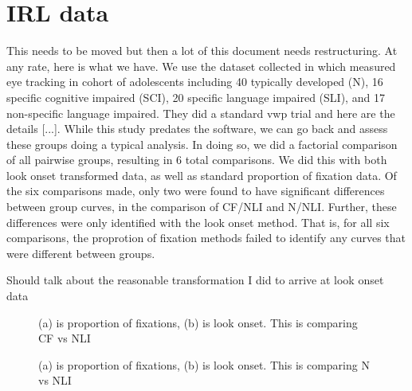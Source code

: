 %


\section{IRL data}

This needs to be moved but then a lot of this document needs restructuring. At any rate, here is what we have. We use the dataset collected in \cite{mcmurray2010individual} which measured eye tracking in cohort of adolescents including 40 typically developed (N), 16 specific cognitive impaired (SCI), 20 specific language impaired (SLI), and 17 non-specific language impaired. They did a standard vwp trial and here are the details [...]. While this study predates the  software,  we can go back and assess these groups doing a typical analysis.  In doing so, we did a factorial comparison of all pairwise groups, resulting in 6 total comparisons. We did this with both look onset transformed data, as well as standard proportion of fixation data. Of the six comparisons made, only two were found to have significant differences between group curves, in the comparison of CF/NLI and N/NLI. Further, these differences were only identified with the look onset method. That is, for all six comparisons, the proprotion of fixation methods failed to identify any curves that were different between groups.

Should talk about the reasonable transformation I did to arrive at look onset data

\begin{figure}[H]
    \centering
    \caption{(a) is proportion of fixations, (b) is look onset. This is comparing CF vs NLI}
\label{fig:irldata1}
\end{figure}

\begin{figure}[H]
    \centering
    \caption{(a) is proportion of fixations, (b) is look onset. This is comparing N vs NLI}
\label{fig:irldata2}
\end{figure}





